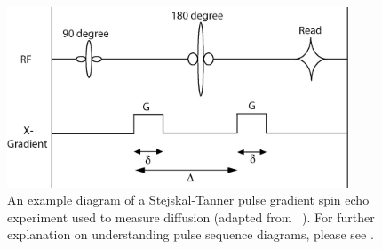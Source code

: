 \begin{figure}[ht]
\begin{center}
\includegraphics[width=4in]{figures/sequence}
\caption{
\label{fig:sequence}
An example diagram of a Stejskal-Tanner pulse gradient spin echo experiment used to measure diffusion (adapted from ~\cite{Behrens2004}).  For further explanation on understanding pulse sequence diagrams, please see \cite{Haacke}.}
\end{center}
\end{figure}

